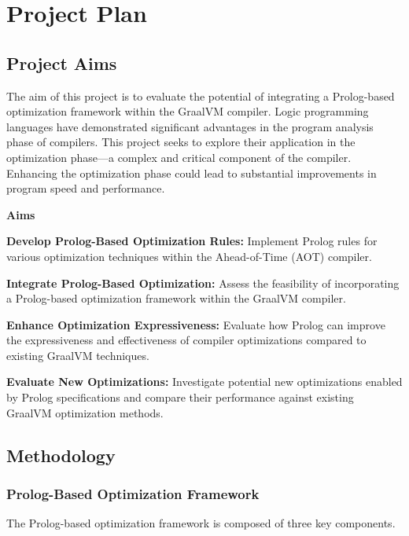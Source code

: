 \chapter[Project Plan]{Project Plan}

\section{Project Aims}
The aim of this project is to evaluate the potential of integrating a Prolog-based optimization framework within the GraalVM compiler. Logic programming languages have demonstrated significant advantages in the program analysis phase of compilers. This project seeks to explore their application in the optimization phase—a complex and critical component of the compiler. Enhancing the optimization phase could lead to substantial improvements in program speed and performance.

\textbf{Aims}
\begin{compactitem}
    \item \textbf{Develop Prolog-Based Optimization Rules:} Implement Prolog rules for various optimization techniques within the Ahead-of-Time (AOT) compiler.
    \item \textbf{Integrate Prolog-Based Optimization:} Assess the feasibility of incorporating a Prolog-based optimization framework within the GraalVM compiler.
    \item \textbf{Enhance Optimization Expressiveness:} Evaluate how Prolog can improve the expressiveness and effectiveness of compiler optimizations compared to existing GraalVM techniques.
    \item \textbf{Evaluate New Optimizations:} Investigate potential new optimizations enabled by Prolog specifications and compare their performance against existing GraalVM optimization methods.
\end{compactitem}

\setcounter{secnumdepth}{3}

\section{Methodology}

\subsection{Prolog-Based Optimization Framework}
The Prolog-based optimization framework is composed of three key components. 

